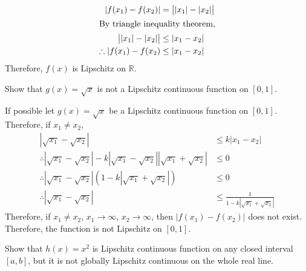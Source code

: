 \documentclass[fleqn, a4paper, 12pt, oneside]{amsart}
\theoremstyle{definition}
\theoremstyle{theorem}
\begin{document}
\begin{solution}
	\begin{align*}
		|f(x_1) - f(x_2)|            & = \left| |x_1| - |x_2| \right| \\
		\intertext{By triangle inequality theorem,}
		\left| |x_1| - |x_2| \right| & \le |x_1 - x_2|                \\
		\therefore |f(x_1) - f(x_2)  & \le |x_1 - x_2|
	\end{align*}
	Therefore, $f(x)$ is Lipschitz on $\mathbb{R}$.
\end{solution}

\begin{question}
	Show that $g(x) = \sqrt{x}$ is not a Lipschitz continuous function on $[0,1]$.
\end{question}

\begin{solution}
	If possible let $g(x) = \sqrt{x}$ be a Lipschitz continuous function on $[0,1]$.\\
	Therefore, if $x_1 \neq x_2$,
	\begin{align*}
		\left| \sqrt{x_1} - \sqrt{x_2} \right|                                                                                              & \le k |x_1 - x_2| \\
		\therefore \left| \sqrt{x_1} - \sqrt{x_2} \right| - k \left| \sqrt{x_1} - \sqrt{x_2} \right| \left| \sqrt{x_1} + \sqrt{x_2} \right| & \le 0             \\
		\therefore \left| \sqrt{x_1} - \sqrt{x_2} \right| \left( 1 - k \left| \sqrt{x_1} + \sqrt{x_2} \right| \right)                       & \le 0             \\
		\therefore \left| \sqrt{x_1} - \sqrt{x_2} \right|                                                                                   & \le \frac{1}{1 - k \left| \sqrt{x_1} + \sqrt{x_2} \right|}
	\end{align*}
	Therefore, if $x_1 \neq x_2$, $x_1 \to \infty$, $x_2 \to \infty$, then $|f(x_1) - f(x_2)|$ does not exist.\\
	Therefore, the function is not Lipschitz on $[0,1]$.
\end{solution}

\begin{question}
	Show that $h(x) = x^2$ is Lipschitz continuous function on any closed interval $[a,b]$, but it is not globally Lipschitz continuous on the whole real line.
\end{question}
\end{document}
